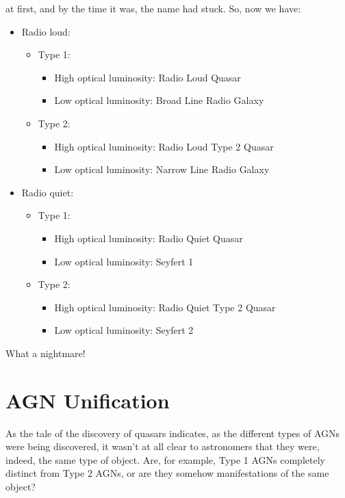 \documentclass[11pt]{article}
\begin{document}
at first, and by the time it was, the name had stuck. So, now we have:
\begin{itemize}
\item Radio loud:
  \begin{itemize}
  \item Type 1:
    \begin{itemize}
    \item High optical luminosity: Radio Loud Quasar
    \item Low optical luminosity: Broad Line Radio Galaxy
    \end{itemize}
  \item Type 2:
    \begin{itemize}
    \item High optical luminosity: Radio Loud Type 2 Quasar
    \item Low optical luminosity: Narrow Line Radio Galaxy
    \end{itemize}
  \end{itemize}
\item Radio quiet:
  \begin{itemize}
  \item Type 1:
    \begin{itemize}
    \item High optical luminosity: Radio Quiet Quasar
    \item Low optical luminosity: Seyfert 1
    \end{itemize}
  \item Type 2:
    \begin{itemize}
    \item High optical luminosity: Radio Quiet Type 2 Quasar
    \item Low optical luminosity: Seyfert 2
    \end{itemize}
  \end{itemize}
\end{itemize}
What a nightmare!

\section{AGN Unification}
As the tale of the discovery of quasars indicates, as the different
types of AGNs were being discovered, it wasn't at all clear to
astronomers that they were, indeed, the same type of object. Are, for
example, Type 1 AGNs completely distinct from Type 2 AGNs, or are they
somehow manifestations of the same object?
\end{document}

